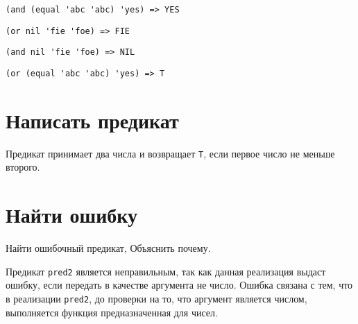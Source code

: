 \problem \hfill
\begin{lstlisting}
(and (equal 'abc 'abc) 'yes) => YES
\end{lstlisting}


\problem \hfill
\begin{lstlisting}
(or nil 'fie 'foe) => FIE
\end{lstlisting}


\problem \hfill
\begin{lstlisting}
(and nil 'fie 'foe) => NIL
\end{lstlisting}


\problem \hfill
\begin{lstlisting}
(or (equal 'abc 'abc) 'yes) => T
\end{lstlisting}



\section{Написать предикат}

\problem
Предикат принимает два числа и возвращает \verb|T|, если первое число не меньше второго.




\section{Найти ошибку}

\problem Найти ошибочный предикат, Объяснить почему.


\noindent
Предикат \verb|pred2| является неправильным, так как данная реализация выдаст ошибку, если передать в качестве аргумента не число. Ошибка связана с тем, что в реализации \verb|pred2|, до проверки на то, что аргумент является числом, выполняется функция предназначенная для чисел.